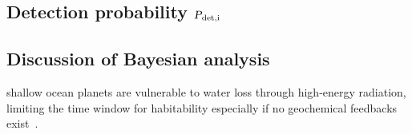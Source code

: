 \documentclass[twocolumn]{aastex631}
\begin{document}
%
%
%


\subsection{Detection probability $\textsl{P}_\mathrm{det, i}$}



\subsection{Discussion of Bayesian analysis}

\begin{note}
    shallow ocean planets are vulnerable to water loss through high-energy radiation, limiting the time window for habitability especially if no geochemical feedbacks exist~\citep{Kite2018}.
\end{note}
\end{document}
